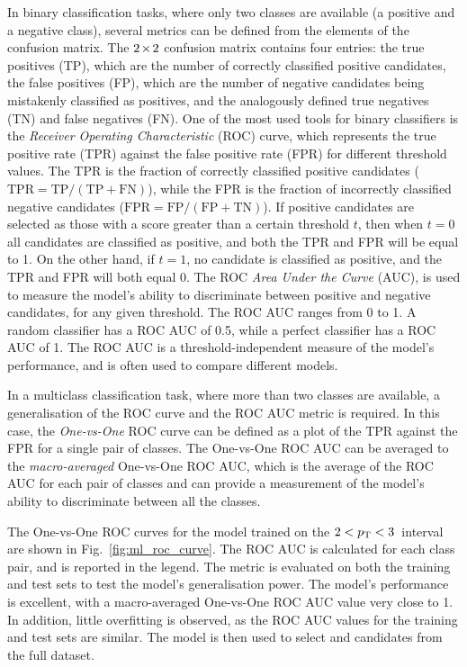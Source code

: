 In binary classification tasks, where only two classes are available (a positive and a negative class), several metrics can be defined from the elements of the confusion matrix. The $2\mkern-2mu\times\mkern-2mu2$ confusion matrix contains four entries: the true positives (TP), which are the number of correctly classified positive candidates, the false positives (FP), which are the number of negative candidates being mistakenly classified as positives, and the analogously defined true negatives (TN) and false negatives (FN). One of the most used tools for binary classifiers is the \emph{Receiver Operating Characteristic} (ROC) curve, which represents the true positive rate (TPR) against the false positive rate (FPR) for different threshold values. The TPR is the fraction of correctly classified positive candidates ($\mathrm{TPR = TP/(TP+FN)}$), while the FPR is the fraction of incorrectly classified negative candidates ($\mathrm{FPR = FP/(FP+TN)}$). If positive candidates are selected as those with a score greater than a certain threshold $t$, then when $t=0$ all candidates are classified as positive, and both the TPR and FPR will be equal to 1. On the other hand, if $t=1$, no candidate is classified as positive, and the TPR and FPR will both equal 0. The ROC \emph{Area Under the Curve} (AUC), is used to measure the model's ability to discriminate between positive and negative candidates, for any given threshold. The ROC AUC ranges from 0 to 1. A random classifier has a ROC AUC of 0.5, while a perfect classifier has a ROC AUC of 1. The ROC AUC is a threshold-independent measure of the model's performance, and is often used to compare different models. 

In a multiclass classification task, where more than two classes are available, a generalisation of the ROC curve and the ROC AUC metric is required. In this case, the \emph{One-vs-One} ROC curve can be defined as a plot of the TPR against the FPR for a single pair of classes. The One-vs-One ROC AUC can be averaged to the \emph{macro-averaged} One-vs-One ROC AUC, which is the average of the ROC AUC for each pair of classes and can provide a measurement of the model's ability to discriminate between all the classes.


The One-vs-One ROC curves for the model trained on the $2<p_\mathrm{T}<3$~\gevc interval are shown in Fig.~\ref{fig:ml_roc_curve}. The ROC AUC is calculated for each class pair, and is reported in the legend. The metric is evaluated on both the training and test sets to test the model's generalisation power. The model's performance is excellent, with a macro-averaged One-vs-One ROC AUC value very close to 1. In addition, little overfitting is observed, as the ROC AUC values for the training and test sets are similar. The model is then used to select \ds and \dpl candidates from the full dataset. 

